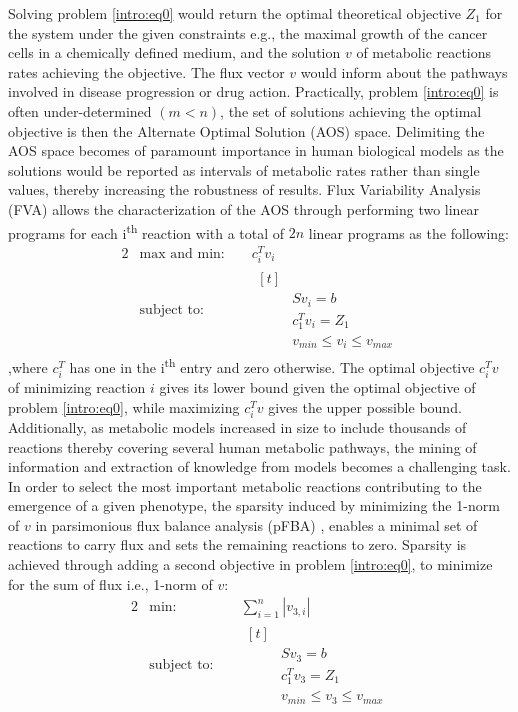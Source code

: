 Solving problem \ref{intro:eq0} would return the optimal theoretical objective $Z_{1}$ for the system under the given constraints e.g., the maximal growth of the cancer cells in a chemically defined medium, and the solution $v$ of metabolic reactions rates achieving the objective. The flux vector $v$ would inform about the pathways involved in disease progression or drug action. 
Practically, problem \ref{intro:eq0} is often under-determined $(m<n)$, the set of solutions achieving the optimal objective is then the Alternate Optimal Solution (AOS) space. Delimiting the AOS space becomes of paramount importance in human biological models as the solutions would be reported as intervals of  metabolic rates rather than single values, thereby increasing the robustness of results. Flux Variability Analysis (FVA) \cite{mahadevan2003effects} allows the characterization of the AOS through performing two linear programs for each i\textsuperscript{th} reaction with a total of $2n$ linear programs as the following:
\begin{alignat*}{2} 
  & \text{max and min: } & & c^{T}_{i}v_{i} \\
   & \text{subject to: }&  & 
   				\begin{aligned}[t] \\
   				& Sv_{i}=b \\
   				& c^{T}_{1}v_{i}=Z_{1} \\
                & v_{min} \leq v_{i} \leq v_{max}
                \end{aligned}
\end{alignat*}
,where $c^{T}_{i}$ has one in the i\textsuperscript{th} entry and zero otherwise. The optimal objective $c^{T}_{i}v$ of minimizing reaction $i$ gives its lower bound given the optimal objective of problem \ref{intro:eq0}, while maximizing $c^{T}_{i}v$ gives the upper possible bound.
Additionally, as metabolic models increased in size to include thousands of reactions thereby covering several human metabolic pathways, the mining of information and extraction of knowledge from models becomes a challenging task. In order to select the most important metabolic reactions contributing to the emergence of a given phenotype, the sparsity induced by minimizing the 1-norm of $v$ in parsimonious flux balance analysis (pFBA) \cite{lewis2010omic}, enables a minimal set of reactions to carry flux and sets the remaining reactions to zero. Sparsity is achieved through adding a second objective in problem \ref{intro:eq0}, to minimize for the sum of flux i.e., 1-norm of $v$:
\begin{alignat*}{2} 
  & \text{min: } & & \sum_{i=1}^{n} |v_{3,i}| \\
   & \text{subject to: }&  & 
   				\begin{aligned}[t] \\
   				& Sv_{3}=b \\
   				& c^{T}_{1}v_{3}=Z_{1} \\
                & v_{min} \leq v_{3} \leq v_{max}
                \end{aligned}
\end{alignat*}

